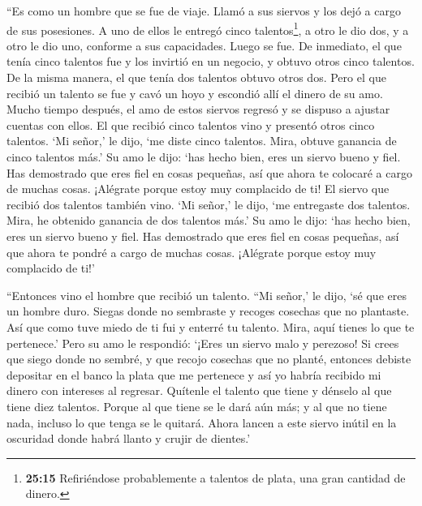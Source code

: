  ``Es como un hombre que se fue de viaje. Llamó a sus
siervos y los dejó a cargo de sus posesiones.  A uno de
ellos le entregó cinco talentos\footnote{\textbf{25:15} Refiriéndose
  probablemente a talentos de plata, una gran cantidad de dinero.}, a
otro le dio dos, y a otro le dio uno, conforme a sus capacidades. Luego
se fue.  De inmediato, el que tenía cinco talentos fue y
los invirtió en un negocio, y obtuvo otros cinco talentos. 
De la misma manera, el que tenía dos talentos obtuvo otros dos.
 Pero el que recibió un talento se fue y cavó un hoyo y
escondió allí el dinero de su amo.  Mucho tiempo después,
el amo de estos siervos regresó y se dispuso a ajustar cuentas con
ellos.  El que recibió cinco talentos vino y presentó otros
cinco talentos. `Mi señor,' le dijo, `me diste cinco talentos. Mira,
obtuve ganancia de cinco talentos más.'  Su amo le dijo:
`has hecho bien, eres un siervo bueno y fiel. Has demostrado que eres
fiel en cosas pequeñas, así que ahora te colocaré a cargo de muchas
cosas. ¡Alégrate porque estoy muy complacido de ti!  El
siervo que recibió dos talentos también vino. `Mi señor,' le dijo, `me
entregaste dos talentos. Mira, he obtenido ganancia de dos talentos
más.'  Su amo le dijo: `has hecho bien, eres un siervo
bueno y fiel. Has demostrado que eres fiel en cosas pequeñas, así que
ahora te pondré a cargo de muchas cosas. ¡Alégrate porque estoy muy
complacido de ti!'

 ``Entonces vino el hombre que recibió un talento. ``Mi
señor,' le dijo, `sé que eres un hombre duro. Siegas donde no sembraste
y recoges cosechas que no plantaste.  Así que como tuve
miedo de ti fui y enterré tu talento. Mira, aquí tienes lo que te
pertenece.'  Pero su amo le respondió: `¡Eres un siervo
malo y perezoso! Si crees que siego donde no sembré, y que recojo
cosechas que no planté,  entonces debiste depositar en el
banco la plata que me pertenece y así yo habría recibido mi dinero con
intereses al regresar.  Quítenle el talento que tiene y
dénselo al que tiene diez talentos.  Porque al que tiene se
le dará aún más; y al que no tiene nada, incluso lo que tenga se le
quitará.  Ahora lancen a este siervo inútil en la oscuridad
donde habrá llanto y crujir de dientes.'

